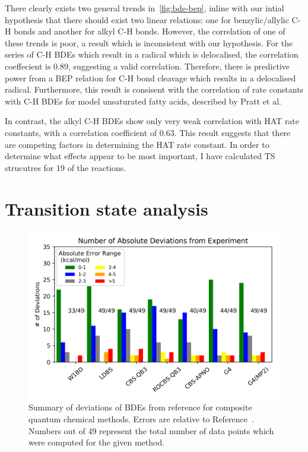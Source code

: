 There clearly exists two general trends in~\ref{fig:bde-bep}, inline with our intial hypothesis that there should exist two linear relations: one for benzylic/allylic C-H bonds and another for alkyl C-H bonds. However, the correlation of one of these trends is poor, a result which is inconsistent with our hypothesis. For the series of C-H BDEs which result in a radical which is delocalised, the correlation coeffecient is 0.89, suggesting a valid correlation. Therefore, there is predictive power from a BEP relation for C-H bond cleavage which results in a delocalised radical. Furthermore, this result is consisent with the correlation of rate constants with C-H BDEs for model unsaturated fatty acids, described by Pratt et al.\cite{Pratt2003}

In contrast, the alkyl C-H BDEs show only very weak correlation with HAT rate constants, with a correlation coefficient of 0.63. This result suggests that there are competing factors in determining the HAT rate constant. In order to determine what effects appear to be most important, I have calculated TS strucutres for 19 of the reactions.

\section{Transition state analysis}


\newpage
{}
\begin{figure}[htb]
  \centering
  \includegraphics[width=\textwidth]{figures/bde-mae-barchart}
  \caption[Summary of deviations of BDEs from reference for composite quantum chemical methods.]{Summary of deviations of BDEs from reference for composite quantum chemical methods. Errors are relative to Reference~\protect{}. Numbers out of 49 represent the total number of data points which were computed for the given method.}
\end{figure}

